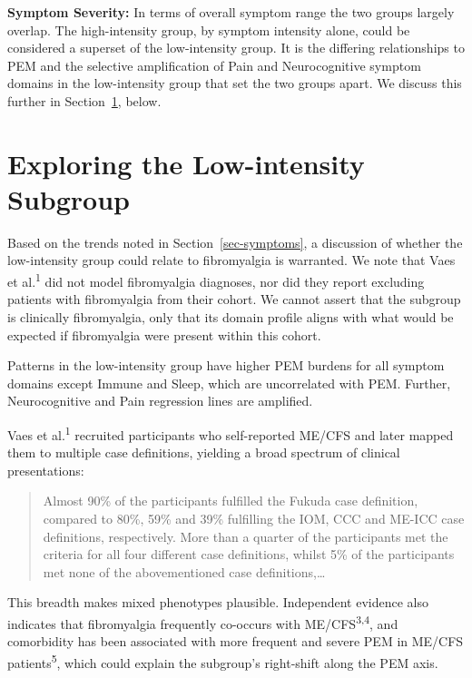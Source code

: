 \documentclass[
  letterpaper,
  DIV=11,
  numbers=noendperiod]{scrartcl}
\begin{document}
\bigskip

\textbf{Symptom Severity:} In terms of overall symptom range the two
groups largely overlap. The high-intensity group, by symptom intensity
alone, could be considered a superset of the low-intensity group. It is
the differing relationships to PEM and the selective amplification of
Pain and Neurocognitive symptom domains in the low-intensity group that
set the two groups apart. We discuss this further in
Section~\ref{sec-li}, below.

\section{Exploring the Low-intensity Subgroup}\label{sec-li}

Based on the trends noted in Section~\ref{sec-symptoms}, a discussion of
whether the low-intensity group could relate to fibromyalgia is
warranted. We note that Vaes et al.\textsuperscript{1} did not model
fibromyalgia diagnoses, nor did they report excluding patients with
fibromyalgia from their cohort. We cannot assert that the subgroup is
clinically fibromyalgia, only that its domain profile aligns with what
would be expected if fibromyalgia were present within this cohort.

Patterns in the low-intensity group have higher PEM burdens for all
symptom domains except Immune and Sleep, which are uncorrelated with
PEM. Further, Neurocognitive and Pain regression lines are amplified.

Vaes et al.\textsuperscript{1} recruited participants who self-reported
ME/CFS and later mapped them to multiple case definitions, yielding a
broad spectrum of clinical presentations:

\begin{quote}
Almost 90\% of the participants fulfilled the Fukuda case definition,
compared to 80\%, 59\% and 39\% fulfilling the IOM, CCC and ME-ICC case
definitions, respectively. More than a quarter of the participants met
the criteria for all four different case definitions, whilst 5\% of the
participants met none of the abovementioned case definitions,\ldots{}
\end{quote}

This breadth makes mixed phenotypes plausible. Independent evidence also
indicates that fibromyalgia frequently co-occurs with
ME/CFS\textsuperscript{3,4}, and comorbidity has been associated with
more frequent and severe PEM in ME/CFS patients\textsuperscript{5},
which could explain the subgroup's right-shift along the PEM axis.
\end{document}
